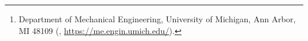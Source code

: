 \author{Aniket Jivani\thanks{Department of Mechanical Engineering, University of Michigan, Ann Arbor, MI 48109 
  (, \url{https://me.engin.umich.edu/}).}
\and Thomas E. Coons\footnotemark[2]
\and Xun Huan\footnotemark[2]}

\usepackage{amsopn}
\DeclareMathOperator{\diag}{diag}


\makeatletter
\newcommand*{\addFileDependency}[1]{%
  \typeout{(#1)}%
  \@addtofilelist{#1}%
  \IfFileExists{#1}{}{\typeout{No file #1.}}%
}
\makeatother

\newcommand*{\myexternaldocument}[1]{%
    \addFileDependency{#1.tex}%
    \addFileDependency{#1.aux}%
}










